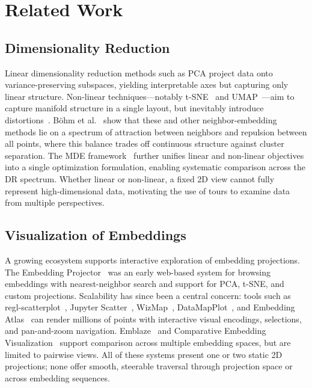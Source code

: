 \documentclass{vgtc}
\begin{document}
\section{Related Work}
\label{sec:related-work}

\subsection{Dimensionality Reduction}
\label{sec:dimensionality-reduction}

Linear dimensionality reduction methods such as PCA project data onto variance-preserving subspaces, yielding interpretable axes but capturing only linear structure. Non-linear techniques---notably \mbox{t-SNE}~\cite{van2008visualizing} and UMAP~\cite{mcinnes2018umap}---aim to capture manifold structure in a single layout, but inevitably introduce distortions~\cite{chari2023specious}. B{\"o}hm et al.~\cite{boehm2022attraction} show that these and other neighbor-embedding methods lie on a spectrum of attraction between neighbors and repulsion between all points, where this balance trades off continuous structure against cluster separation. The MDE framework~\cite{agrawal2021mde} further unifies linear and non-linear objectives into a single optimization formulation, enabling systematic comparison across the DR spectrum. Whether linear or non-linear, a fixed 2D view cannot fully represent high-dimensional data, motivating the use of tours to examine data from multiple perspectives.

\subsection{Visualization of Embeddings}
\label{sec:embedding-visualization}

A growing ecosystem supports interactive exploration of embedding projections. The Embedding Projector~\cite{embedding_projector} was an early web-based system for browsing embeddings with nearest-neighbor search and support for PCA, t-SNE, and custom projections. Scalability has since been a central concern: tools such as regl-scatterplot~\cite{lekschas2023regl}, Jupyter Scatter~\cite{lekschas2024jupyter}, WizMap~\cite{wang2023wizmap}, DataMapPlot~\cite{mcinnes2024datamapplot}, and Embedding Atlas~\cite{ren2025embedding_atlas} can render millions of points with interactive visual encodings, selections, and pan-and-zoom navigation. Emblaze~\cite{sivaraman2022emblaze} and Comparative Embedding Visualization~\cite{manz2024general} support comparison across multiple embedding spaces, but are limited to pairwise views. All of these systems present one or two static 2D projections; none offer smooth, steerable traversal through projection space or across embedding sequences.
\end{document}

